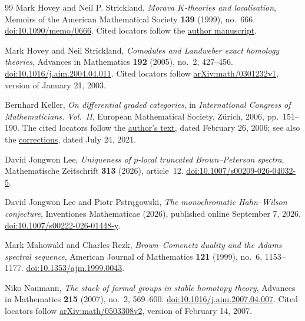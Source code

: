 \begin{thebibliography}{99}
Mark Hovey and Neil P. Strickland,
\emph{Morava $K$-theories and localisation},
Memoirs of the American Mathematical Society \textbf{139} (1999),
no.~666.
\href{https://doi.org/10.1090/memo/0666}{doi:10.1090/memo/0666}.
Cited locators follow the
\href{https://www.sas.rochester.edu/mth/sites/doug-ravenel/otherpapers/kn.pdf}{author manuscript}.

Mark Hovey and Neil Strickland,
\emph{Comodules and Landweber exact homology theories},
Advances in Mathematics \textbf{192} (2005), no.~2, 427--456.
\href{https://doi.org/10.1016/j.aim.2004.04.011}{doi:10.1016/j.aim.2004.04.011}.
Cited locators follow
\href{https://arxiv.org/abs/math/0301232v1}{arXiv:math/0301232v1},
version of January 21, 2003.

Bernhard Keller,
\emph{On differential graded categories},
in \emph{International Congress of Mathematicians. Vol.~II},
European Mathematical Society, Z\"urich, 2006, pp.~151--190.
The cited locators follow the
\href{https://webusers.imj-prg.fr/~bernhard.keller/publ/dgcat.pdf}{author's text},
dated February 26, 2006; see also the
\href{https://webusers.imj-prg.fr/~bernhard.keller/publ/KellerCorrDGCategories.pdf}{corrections},
dated July 24, 2021.

David Jongwon Lee,
\emph{Uniqueness of $p$-local truncated Brown--Peterson spectra},
Mathematische Zeitschrift \textbf{313} (2026), article~12.
\href{https://doi.org/10.1007/s00209-026-04032-5}{doi:10.1007/s00209-026-04032-5}.

David Jongwon Lee and Piotr Pstr\k{a}gowski,
\emph{The monochromatic Hahn--Wilson conjecture},
Inventiones Mathematicae (2026), published online September 7, 2026.
\href{https://doi.org/10.1007/s00222-026-01448-y}{doi:10.1007/s00222-026-01448-y}.

Mark Mahowald and Charles Rezk,
\emph{Brown--Comenetz duality and the Adams spectral sequence},
American Journal of Mathematics \textbf{121} (1999), no.~6, 1153--1177.
\href{https://doi.org/10.1353/ajm.1999.0043}{doi:10.1353/ajm.1999.0043}.

Niko Naumann,
\emph{The stack of formal groups in stable homotopy theory},
Advances in Mathematics \textbf{215} (2007), no.~2, 569--600.
\href{https://doi.org/10.1016/j.aim.2007.04.007}{doi:10.1016/j.aim.2007.04.007}.
Cited locators follow
\href{https://arxiv.org/abs/math/0503308v2}{arXiv:math/0503308v2},
version of February 14, 2007.


\end{thebibliography}
